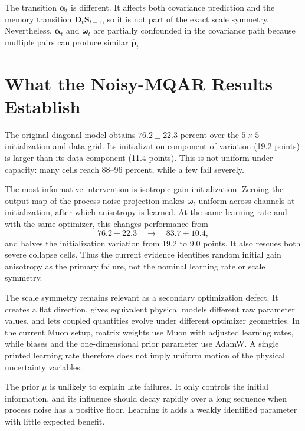 \documentclass[11pt]{article}
\newcommand{\vct}[1]{\boldsymbol{#1}}
\begin{document}
The transition $\vct{\alpha}_t$ is different. It affects both covariance prediction and the
memory transition $\vct{D}_t\vct{S}_{t-1}$, so it is not part of the exact scale symmetry.
Nevertheless, $\vct{\alpha}_t$ and $\vct{\omega}_t$ are partially confounded in the covariance
path because multiple pairs can produce similar $\widehat{\vct{p}}_t$.

\section{What the Noisy-MQAR Results Establish}

The original diagonal model obtains $76.2\pm22.3$ percent over the $5\times5$ initialization
and data grid. Its initialization component of variation (19.2 points) is larger than its data
component (11.4 points). This is not uniform under-capacity: many cells reach 88--96 percent,
while a few fail severely.

The most informative intervention is isotropic gain initialization. Zeroing the output map of
the process-noise projection makes $\vct{\omega}_t$ uniform across channels at initialization,
after which anisotropy is learned. At the same learning rate and with the same optimizer, this
changes performance from
\begin{equation}
  76.2\pm22.3 \quad\longrightarrow\quad 83.7\pm10.4,
\end{equation}
and halves the initialization variation from 19.2 to 9.0 points. It also rescues both severe
collapse cells. Thus the current evidence identifies random initial gain anisotropy as the
primary failure, not the nominal learning rate or scale symmetry.

The scale symmetry remains relevant as a secondary optimization defect. It creates a flat
direction, gives equivalent physical models different raw parameter values, and lets coupled
quantities evolve under different optimizer geometries. In the current Muon setup, matrix
weights use Muon with adjusted learning rates, while biases and the one-dimensional prior
parameter use AdamW. A single printed learning rate therefore does not imply uniform motion of
the physical uncertainty variables.

The prior $\mu$ is unlikely to explain late failures. It only controls the initial information,
and its influence should decay rapidly over a long sequence when process noise has a positive
floor. Learning it adds a weakly identified parameter with little expected benefit.
\end{document}

